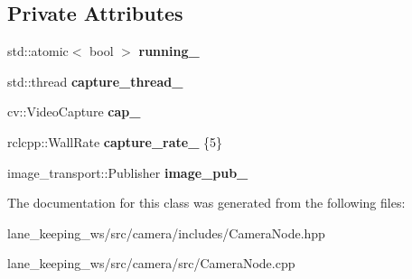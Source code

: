 \subsection*{Private Attributes}
\begin{DoxyCompactItemize}
\item 
\mbox{\label{classCameraNode_a589ef67a59d2205bb65beeaef950fb29}} 
std\+::atomic$<$ bool $>$ {\bfseries running\+\_\+}
\item 
\mbox{\label{classCameraNode_ad29d310c3d87b40124d35562c62af9ef}} 
std\+::thread {\bfseries capture\+\_\+thread\+\_\+}
\item 
\mbox{\label{classCameraNode_a4d4f490deef80022a254d3de565f2611}} 
cv\+::\+Video\+Capture {\bfseries cap\+\_\+}
\item 
\mbox{\label{classCameraNode_aa2d3737c639b0ca7a332eb4ad427153b}} 
rclcpp\+::\+Wall\+Rate {\bfseries capture\+\_\+rate\+\_\+} \{5\}
\item 
\mbox{\label{classCameraNode_a59ce8fd47a93d1baecb2611ee5336d7b}} 
image\+\_\+transport\+::\+Publisher {\bfseries image\+\_\+pub\+\_\+}
\end{DoxyCompactItemize}


The documentation for this class was generated from the following files\+:\begin{DoxyCompactItemize}
\item 
lane\+\_\+keeping\+\_\+ws/src/camera/includes/Camera\+Node.\+hpp\item 
lane\+\_\+keeping\+\_\+ws/src/camera/src/Camera\+Node.\+cpp\end{DoxyCompactItemize}
